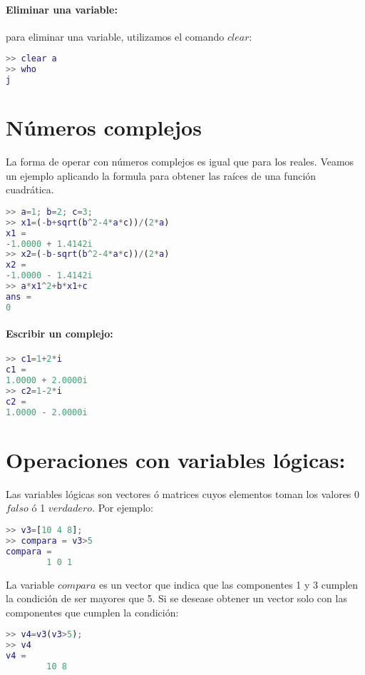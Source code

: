 \paragraph{Eliminar una variable:}para eliminar una variable, utilizamos el comando $clear$:
\begin{lstlisting}[language=Matlab]
>> clear a
>> who
j
\end{lstlisting}


\section{Números complejos}

La forma de operar con números complejos es igual que para los reales. Veamos un ejemplo aplicando la formula para obtener las raíces de una función cuadrática.

\begin{lstlisting}[language=Matlab]
>> a=1; b=2; c=3;
>> x1=(-b+sqrt(b^2-4*a*c))/(2*a)
x1 =
-1.0000 + 1.4142i
>> x2=(-b-sqrt(b^2-4*a*c))/(2*a)
x2 =
-1.0000 - 1.4142i
>> a*x1^2+b*x1+c
ans =
0
\end{lstlisting}

\paragraph{Escribir un complejo:}
\begin{lstlisting}[language=Matlab]
>> c1=1+2*i
c1 =
1.0000 + 2.0000i
>> c2=1-2*i
c2 =
1.0000 - 2.0000i
\end{lstlisting}




\section{Operaciones con variables lógicas:}

Las variables lógicas son vectores ó matrices cuyos elementos toman los valores 0 $falso$ ó 1 $verdadero$. Por ejemplo:
\begin{lstlisting}[language=Matlab]
>> v3=[10 4 8];
>> compara = v3>5
compara =
		1 0 1
\end{lstlisting}

La variable $compara$ es un vector que indica que las componentes 1 y 3 cumplen la condición de ser mayores que 5. Si se desease obtener un vector solo con las componentes que cumplen la condición:
\begin{lstlisting}[language=Matlab]
>> v4=v3(v3>5);
>> v4
v4 =
		10 8
\end{lstlisting}

